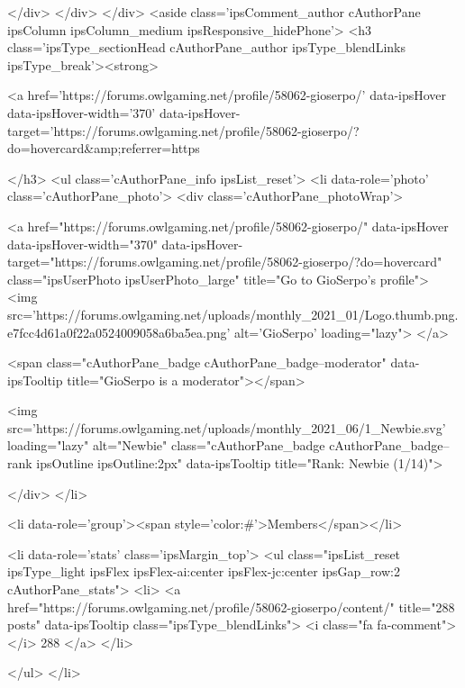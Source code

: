 			</div>
		</div>
	</div>
	<aside class='ipsComment_author cAuthorPane ipsColumn ipsColumn_medium ipsResponsive_hidePhone'>
		<h3 class='ipsType_sectionHead cAuthorPane_author ipsType_blendLinks ipsType_break'><strong>


<a href='https://forums.owlgaming.net/profile/58062-gioserpo/' data-ipsHover data-ipsHover-width='370' data-ipsHover-target='https://forums.owlgaming.net/profile/58062-gioserpo/?do=hovercard&amp;referrer=https%
			
		</h3>
		<ul class='cAuthorPane_info ipsList_reset'>
			<li data-role='photo' class='cAuthorPane_photo'>
				<div class='cAuthorPane_photoWrap'>
					


	<a href="https://forums.owlgaming.net/profile/58062-gioserpo/" data-ipsHover data-ipsHover-width="370" data-ipsHover-target="https://forums.owlgaming.net/profile/58062-gioserpo/?do=hovercard" class="ipsUserPhoto ipsUserPhoto_large" title="Go to GioSerpo's profile">
		<img src='https://forums.owlgaming.net/uploads/monthly_2021_01/Logo.thumb.png.e7fcc4d61a0f22a0524009058a6ba5ea.png' alt='GioSerpo' loading="lazy">
	</a>

					
						<span class="cAuthorPane_badge cAuthorPane_badge--moderator" data-ipsTooltip title="GioSerpo is a moderator"></span>
					
					
						
<img src='https://forums.owlgaming.net/uploads/monthly_2021_06/1_Newbie.svg' loading="lazy" alt="Newbie" class="cAuthorPane_badge cAuthorPane_badge--rank ipsOutline ipsOutline:2px" data-ipsTooltip title="Rank: Newbie (1/14)">
					
				</div>
			</li>
			
				<li data-role='group'><span style='color:#'>Members</span></li>
				
			
			
				<li data-role='stats' class='ipsMargin_top'>
					<ul class="ipsList_reset ipsType_light ipsFlex ipsFlex-ai:center ipsFlex-jc:center ipsGap_row:2 cAuthorPane_stats">
						<li>
							<a href="https://forums.owlgaming.net/profile/58062-gioserpo/content/" title="288 posts" data-ipsTooltip class="ipsType_blendLinks">
								<i class="fa fa-comment"></i> 288
							</a>
						</li>
						
					</ul>
				</li>
			
			
				

